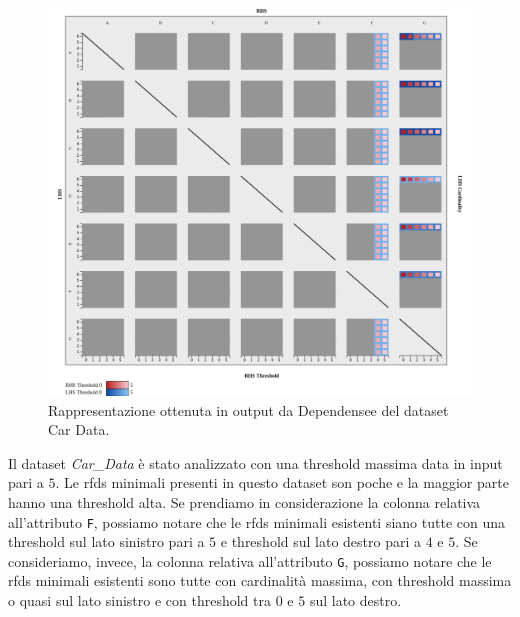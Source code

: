 \begin{figure}[ht]
    \centering
    \includegraphics[width=\linewidth]{capitoli/figure/car_data}
    \caption{Rappresentazione ottenuta in output da Dependensee del dataset Car Data.}
    \label{fig:cardata_result}
\end{figure}
Il dataset \textit{Car\_Data} \`{e} stato analizzato con una threshold massima data in input pari a $5$. Le \acrlong{rfds} minimali presenti in questo dataset son poche e la maggior parte hanno una threshold alta. Se prendiamo in considerazione la colonna relativa all'attributo \texttt{F}, possiamo notare che le \acrlong{rfds} minimali esistenti siano tutte con una threshold sul lato sinistro pari a $5$ e threshold sul lato destro pari a $4$ e $5$. Se consideriamo, invece, la colonna relativa all'attributo \texttt{G}, possiamo notare che le \acrlong{rfds} minimali esistenti sono tutte con cardinalit\`{a} massima, con threshold massima o quasi sul lato sinistro e con threshold tra $0$ e $5$ sul lato destro.